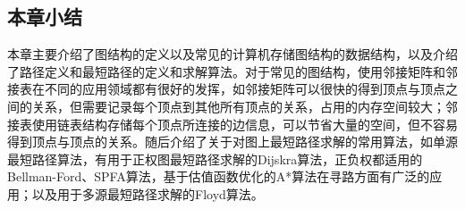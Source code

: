 \subsection{本章小结}
\par{\kaishu 本章主要介绍了图结构的定义以及常见的计算机存储图结构的数据结构，以及介绍了路径定义和最短路径的定义和求解算法。对于常见的图结构，使用邻接矩阵和邻接表在不同的应用领域都有很好的发挥，如邻接矩阵可以很快的得到顶点与顶点之间的关系，但需要记录每个顶点到其他所有顶点的关系，占用的内存空间较大；邻接表使用链表结构存储每个顶点所连接的边信息，可以节省大量的空间，但不容易得到顶点与顶点的关系。随后介绍了关于对图上最短路径求解的常用算法，如单源最短路径算法，有用于正权图最短路径求解的Dijskra算法，正负权都适用的Bellman-Ford、SPFA算法，基于估值函数优化的A*算法在寻路方面有广泛的应用；以及用于多源最短路径求解的Floyd算法。}
